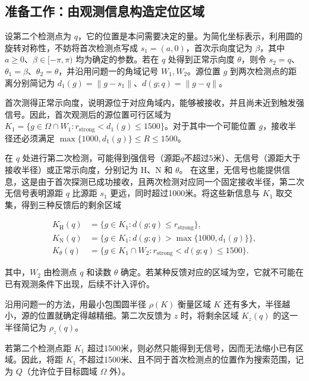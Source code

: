 \documentclass[UTF8,a4paper,zihao=-4,fontset=none]{ctexart}
\begin{document}
\subsection{准备工作：由观测信息构造定位区域}

设第二个检测点为 \(q\)，它的位置是本问需要决定的量。为简化坐标表示，利用圆的旋转对称性，不妨将首次检测点写成 \(s_1=(a,0)\)，首次示向度记为 \(\beta\)，其中 \(a\ge0\)、\(\beta\in[-\pi,\pi)\) 均为确定的参数。若在 \(q\) 处得到正常示向度 \(\theta\)，则令 \(s_2=q\)、\(\theta_1=\beta\)、\(\theta_2=\theta\)，并沿用问题一的角域记号 \(W_1,W_2\)。源位置 \(g\) 到两次检测点的距离分别简记为 \(d_1(g)=\|g-s_1\|\)、\(d(g;q)=\|g-q\|\)。

首次测得正常示向度，说明源位于对应角域内，能够被接收，并且尚未近到触发强信号。因此，首次观测后的源位置可行区域为 \(K_1=\{g\in\Omega\cap W_1:r_{\mathrm{strong}}<d_1(g)\le1500\}\)。对于其中一个可能位置 \(g\)，接收半径还必须满足 \(\max\{1000,d_1(g)\}\le R\le1500\)。

在 \(q\) 处进行第二次检测，可能得到强信号（源距\(q\)不超过5米）、无信号（源距大于接收半径）或正常示向度，分别记为 \(\mathrm H\)、\(\mathrm N\) 和 \(\theta\)。
在这里，无信号也能提供信息，这是由于首次探测已成功接收，且两次检测对应同一个固定接收半径，第二次无信号表明源距 \(q\) 比源距 \(s_1\) 更远，同时超过1000米。将这些新信息与 \(K_1\) 取交集，得到三种反馈后的剩余区域

\begin{equation}
\begin{aligned}
K_{\mathrm H}(q)&=\{g\in K_1:d(g;q)\le r_{\mathrm{strong}}\},\\
K_{\mathrm N}(q)&=\{g\in K_1:d(g;q)>\max\{1000,d_1(g)\}\},\\
K_\theta(q)&=\{g\in K_1\cap W_2:r_{\mathrm{strong}}<d(g;q)\le1500\}.
\end{aligned}
\label{eq:q2-pair-regions}
\end{equation}

其中，\(W_2\) 由检测点 \(q\) 和读数 \(\theta\) 确定。若某种反馈对应的区域为空，它就不可能在已有观测条件下出现，后续不计入评价。

沿用问题一的方法，用最小包围圆半径 \(\rho(K)\) 衡量区域 \(K\) 还有多大，半径越小，源的位置就确定得越精细。第二次反馈为 \(z\) 时，将剩余区域 \(K_z(q)\) 的这一半径简记为 \(\rho_z(q)\)。

若第二个检测点距 \(K_1\) 超过1500米，则必然只能得到无信号，因而无法缩小已有区域。因此，将距 \(K_1\) 不超过1500米、且不同于首次检测点的位置作为搜索范围，记为 \(Q\)（允许位于目标圆域 \(\Omega\) 外）。
\end{document}
